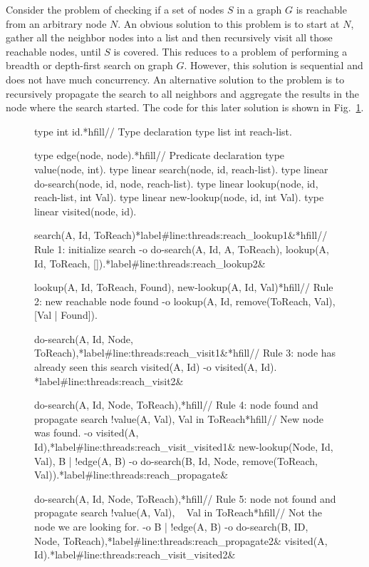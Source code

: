 Consider the problem of checking if a set of nodes $S$ in a graph $G$ is
reachable from an arbitrary node $N$. An obvious solution to this problem is to
start at $N$, gather all the neighbor nodes into a list and then recursively
visit all those reachable nodes, until $S$ is covered. This reduces to a problem
of performing a breadth or depth-first search on graph $G$. However, this
solution is sequential and does not have much concurrency.  An alternative
solution to the problem is to recursively propagate the search to all neighbors
and aggregate the results in the node where the search started.  The code for
this later solution is shown in Fig.~\ref{code:threads:reach_simple}.

\begin{figure}[h]
\begin{LineCode}[commandchars=*\#\&]
type int id.*hfill// Type declaration
type list int reach-list.

type edge(node, node).*hfill// Predicate declaration
type value(node, int).
type linear search(node, id, reach-list).
type linear do-search(node, id, node, reach-list).
type linear lookup(node, id, reach-list, int Val).
type linear new-lookup(node, id, int Val).
type linear visited(node, id).

search(A, Id, ToReach)*label#line:threads:reach_lookup1&*hfill// Rule 1: initialize search
   -o do-search(A, Id, A, ToReach),
      lookup(A, Id, ToReach, []).*label#line:threads:reach_lookup2&

lookup(A, Id, ToReach, Found), new-lookup(A, Id, Val)*hfill// Rule 2: new reachable node found
   -o lookup(A, Id, remove(ToReach, Val), [Val | Found]).

do-search(A, Id, Node, ToReach),*label#line:threads:reach_visit1&*hfill// Rule 3: node has already seen this search
visited(A, Id)
   -o visited(A, Id). *label#line:threads:reach_visit2&

do-search(A, Id, Node, ToReach),*hfill// Rule 4: node found and propagate search
!value(A, Val), Val in ToReach*hfill// New node was found.
   -o visited(A, Id),*label#line:threads:reach_visit_visited1&
      new-lookup(Node, Id, Val),
      {B | !edge(A, B) -o do-search(B, Id, Node, remove(ToReach, Val))}.*label#line:threads:reach_propagate&

do-search(A, Id, Node, ToReach),*hfill// Rule 5: node not found and propagate search
!value(A, Val), ~ Val in ToReach*hfill// Not the node we are looking for.
   -o {B | !edge(A, B) -o do-search(B, ID, Node, ToReach)},*label#line:threads:reach_propagate2&
      visited(A, Id).*label#line:threads:reach_visit_visited2&
\end{LineCode}

\label{code:threads:reach_simple}
\end{figure}

